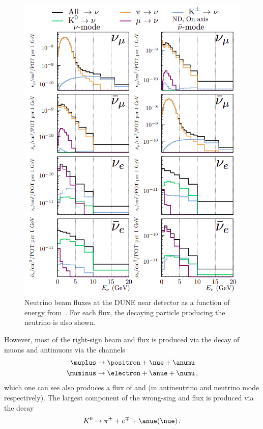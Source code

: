\begin{figure}[h]
  \centering
  \includegraphics[width=.9\linewidth]{files/figures/dune_detector/duneNDFlux}
  \caption[Neutrino beam fluxes at the DUNE near detector as a function of neutrino energy.]{Neutrino beam fluxes at the DUNE near detector as a function of energy from~\cite{tdrVol2}. For each flux, the decaying particle producing the neutrino is also shown.}
  \label{fig:ndFluxes}
\end{figure}

However, most of the right-sign beam \nue and \anue flux is produced via the decay of muons and antimuons via the channels
\begin{align}
  \muplus &\rightarrow \positron + \nue + \anumu \\
  \muminus &\rightarrow \electron + \anue + \numu \, ,
\end{align}
which one can see also produces a flux of \numu and \anumu (in antineutrino and neutrino mode respectively).
The largest component of the wrong-sing \nue and \anue flux is produced via the decay
\begin{equation}
 K^{0} \rightarrow \pi^{\pm} + e^{\mp} + \anue(\nue) \, .	
\end{equation}

